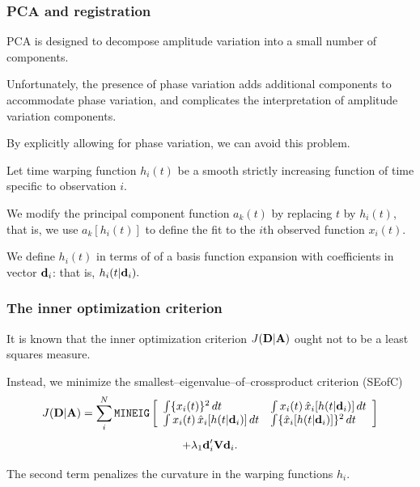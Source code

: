 \documentclass[11pt]{beamer}
\begin{document}
\begin{frame}

\frametitle{PCA and registration}

\bi
  \item PCA is designed to decompose amplitude variation into a small number of components.
  \item Unfortunately, the presence of phase variation adds additional components to accommodate phase variation, and complicates the interpretation of amplitude variation components.
  \item By explicitly allowing for phase variation, we can avoid this problem.
  \item Let time warping function $h_i(t)$ be a smooth strictly increasing function of time specific to observation $i$.
  \item We modify the principal component function $a_k(t)$ by replacing $t$ by $h_i(t)$, that is, we use $a_k[h_i(t)]$ to define the fit to the $i$th observed function $x_i(t)$.
  \item We define $h_i(t)$ in terms of of a basis function expansion with coefficients in vector $\mbox{\bf d}_i$:
  that is, $h_i(t|\mbox{\bf d}_i).$
\ei

\end{frame}


\begin{frame}

\frametitle{The inner optimization criterion}

\bi
  \item It is known that the inner optimization criterion $J(\mbox{\bf D}|\mbox{\bf A})$ ought not to be a least squares measure.
  \item Instead, we minimize the smallest--eigenvalue--of--crossproduct criterion (SEofC)
\ei
  \[
    J(\mbox{\bf D}|\mbox{\bf A}) = \sum_i^N \mbox{\tt MINEIG}
  \left[
     \begin{array}{ll}
       \int \{x_i(t)\}^2                       \, dt &
       \int x_i(t) \, \hat{x}_i[h(t|\mbox{\bf d}_i)]   \, dt \\
       \int x_i(t) \, \hat{x}_i[h(t|\mbox{\bf d}_i)]   \, dt &
       \int \{\hat{x}_i[h(t|\mbox{\bf d}_i)]\}^2       \, dt
     \end{array}
   \right]
  \]
  \[
   + \lambda_1 \mbox{\bf d}_i' \mbox{\bf V} \mbox{\bf d}_i.
  \]
\bi
  \item The second term penalizes the curvature in the warping functions $h_i$.
\ei

\end{frame}
\end{document}
